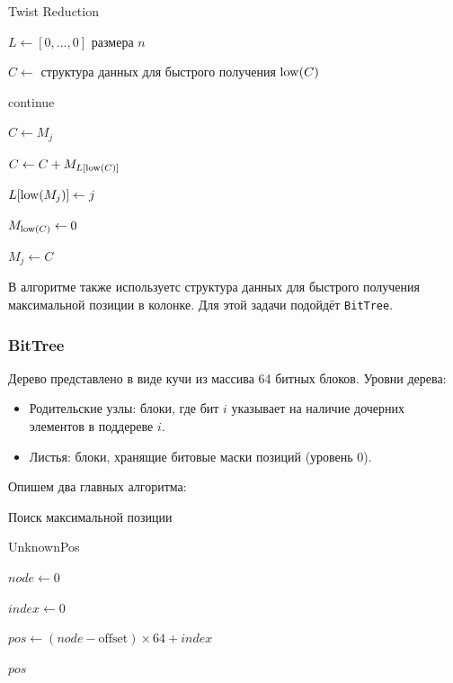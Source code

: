 \documentclass{article}
\begin{document}
\begin{algorithm}[H]
\caption{Twist Reduction}
$L \gets [0,\dots,0]$ размера $n$ 

$C \gets$ структура данных для быстрого получения $\mathop{\rm low}(C)$

 {
   {
     {
      continue
    }

    $C \gets M_j$

     {
      $C \gets C + M_{L[\mathop{\rm low}(C)]}$ 
    }

     {
      $L[\mathop{\rm low}(M_j)] \gets j$

      $M_{\mathop{\rm low}(C)} \gets 0$ 
    }

    $M_j \gets C$
  }
}

\end{algorithm}

В алгоритме также используетс структура данных для быстрого получения максимальной позиции в колонке. Для этой задачи подойдёт \texttt{BitTree}.

\subsubsection{BitTree}
Дерево представлено в виде кучи из массива 64 битных блоков. Уровни дерева:
\begin{itemize}
  \item Родительские узлы: блоки, где бит $i$ указывает на наличие дочерних элементов в поддереве $i$.
  \item Листья: блоки, хранящие битовые маски позиций (уровень 0).
\end{itemize} 
Опишем два главных алгоритма:

\begin{algorithm}[H]
\caption{Поиск максимальной позиции}
 { 
    \Return UnknownPos
}

$node \gets 0$

$index \gets 0$

$pos \gets (node - \text{offset}) \times 64 + index$

\Return $pos$
\end{algorithm}
\end{document}

